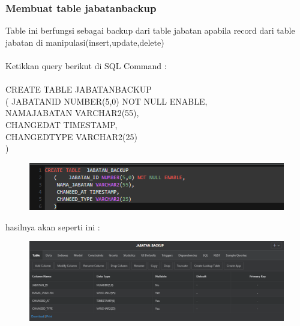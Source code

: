 \documentclass[12pt, times new roman, a4paper]{report}
\begin{document}
\subsubsection{Membuat table jabatan\textunderscore backup}
\hspace{1cm} Table ini berfungsi sebagai backup dari table jabatan apabila record dari table jabatan di manipulasi(insert,update,delete)\\
\\
Ketikkan query berikut di SQL Command :\\
\\
CREATE TABLE  JABATAN\textunderscore BACKUP\\ 
   (	JABATAN\textunderscore ID NUMBER(5,0) NOT NULL ENABLE,\\ 
	NAMA\textunderscore JABATAN VARCHAR2(55),\\
	CHANGED\textunderscore AT TIMESTAMP,\\ 
	CHANGED\textunderscore TYPE VARCHAR2(25)\\
   )
\begin{figure}[h]
	\centering
		\includegraphics[scale=0.8]{gambar/15}
\end{figure}   
\par hasilnya akan seperti ini :
\begin{figure}[h]
	\centering
		\includegraphics[scale=0.4]{gambar/16}
\end{figure}
\end{document}
